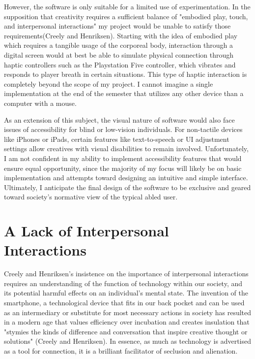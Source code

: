 \documentclass[10pt,twocolumn]{article}
\begin{document}
However, the software is only suitable for a limited use of experimentation. In the supposition that creativity requires a sufficient balance of "embodied play, touch, and interpersonal interactions" my project would be unable to satisfy those requirements(Creely and Henriksen). Starting with the idea of embodied play which requires a tangible usage of the corporeal body, interaction through a digital screen would at best be able to simulate physical connection through haptic controllers such as the Playstation Five controller, which vibrates and responds to player breath in certain situations. This type of haptic interaction is completely beyond the scope of my project. I cannot imagine a single implementation at the end of the semester that utilizes any other device than a computer with a mouse.  

As an extension of this subject, the visual nature of software would also face issues of accessibility for blind or low-vision individuals. For non-tactile devices like iPhones or iPads, certain features like text-to-speech or UI adjustment settings allow creatives with visual disabilities to remain involved. Unfortunately, I am not confident in my ability to implement accessibility features that would ensure equal opportunity, since the majority of my focus will likely be on basic implementation and attempts toward designing an intuitive and simple interface. Ultimately, I anticipate the final design of the software to be exclusive and geared toward society's normative view of the typical abled user. 

\section{A Lack of Interpersonal Interactions}
Creely and Henriksen's insistence on the importance of interpersonal interactions requires an understanding of the function of technology within our society, and its potential harmful effects on an individual's mental state. The invention of the smartphone, a technological device that fits in our back pocket and can be used as an intermediary or substitute for most necessary actions in society has resulted in a modern age that values efficiency over incubation and creates insulation that "stymies the kinds of difference and conversation that inspire creative thought or solutions" (Creely and Henriksen). In essence, as much as technology is advertised as a tool for connection, it is a brilliant facilitator of seclusion and alienation. 
\end{document}
